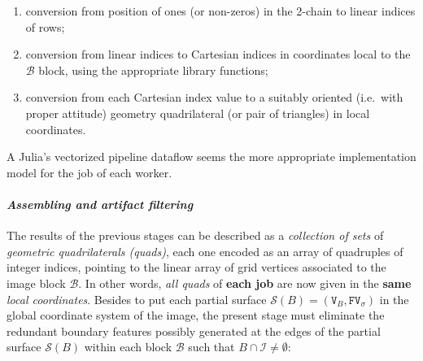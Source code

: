 \documentclass[11pt, oneside]{amsart}   	%
\begin{document}
\begin{enumerate}

\item conversion from position of ones (or non-zeros) in the 2-chain to linear indices of rows;

\item conversion from linear indices to Cartesian indices in coordinates local to the $\mathcal{B}$ block, using the appropriate library functions;

\item conversion from each Cartesian index value to a suitably oriented (i.e.~with proper attitude) geometry quadrilateral (or pair of triangles) in local coordinates.

\end{enumerate}

A Julia's vectorized pipeline dataflow seems the more appropriate implementation model for the job of each worker.

\paragraph{\emph{Assembling and artifact filtering}}
The results of the previous stages can be described as a \emph{collection of sets} of \emph{geometric quadrilaterals (quads)}, each one encoded as an array of quadruples of integer indices, pointing to the linear array of grid vertices associated to the image block $\mathcal{B}$.  In other words, \emph{all quads} of \textbf{each job} are now given in the \textbf{same} \emph{local coordinates}.  Besides to put each partial surface $\mathcal{S}(B) = (\texttt{V}_B, \texttt{FV}_\sigma)$ in the global coordinate system of the image, the present stage must eliminate the redundant boundary features possibly generated at the edges of the partial surface $\mathcal{S}(B)$ within each block $\mathcal{B}$ such that $B \cap \mathcal{I} \not= \emptyset$:
\end{document}
